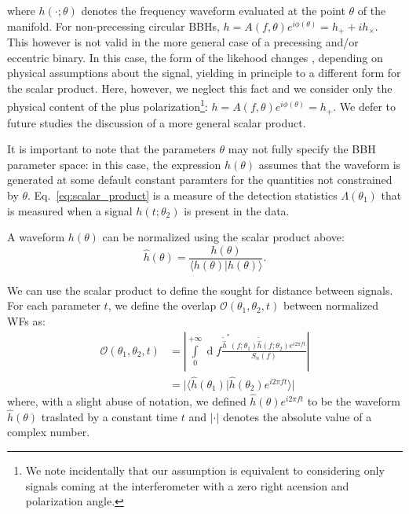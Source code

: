 \documentclass[twocolumn,showpacs,preprintnumbers,nofootinbib,prd,
superscriptaddress,10pt]{revtex4-2}
\renewcommand{\d}[1]{\ensuremath{\operatorname{d}\!{#1}}}
\newcommand{\scalar}[2]{\langle #1|#2 \rangle}
\begin{document}
where $h(\cdot; \theta)$ denotes the frequency waveform evaluated at the point $\theta$ of the manifold.
For non-precessing circular BBHs, $h = A(f,\theta) e^{i\phi(\theta)} = h_+ + i h_\times$. This however is not valid in the more general case of a precessing and/or eccentric binary. In this case, the form of the likehood changes \cite{Harry:2016ijz, PhysRevD.97.023004}, depending on physical assumptions about the signal, yielding in principle to a different form for the scalar product. Here, however, we neglect this fact and we consider only the physical content of the plus polarization\footnote{
We note incidentally that our assumption is equivalent to considering only signals coming at the interferometer with a zero right acension and polarization angle.}:
$h = A(f,\theta) e^{i\phi(\theta)} = h_+$. We defer to future studies the discussion of a more general scalar product.

It is important to note that the parameters $\theta$ may not fully specify the BBH parameter space: in this case, the expression $h(\theta)$ assumes that the waveform is generated at some default constant paramters for the quantities not constrained by $\theta$.
Eq.~\eqref{eq:scalar_product} is a measure of the detection statistics $\Lambda(\theta_1)$ that is measured when a signal $h(t; \theta_2)$ is present in the data.

A waveform $h(\theta)$ can be normalized using the scalar product above:
\begin{equation} \label{eq:normalization}
	\hat{h}(\theta) = \frac{h(\theta)}{\scalar{h(\theta)}{h(\theta)}}.
\end{equation}

We can use the scalar product to define the sought for distance between signals.
For each parameter $t$, we define the overlap $\mathcal{O}(\theta_1,\theta_2, t)$ between normalized WFs as:
\begin{align}\label{eq:overlap}
	\mathcal{O}(\theta_1,\theta_2, t) &= \left\lvert \int\limits_{0}^{+\infty} \d{f} \frac{\tilde{\hat{h}}^*(f;\theta_1)\tilde{\hat{h}}(f;\theta_2) e^{i2\pi ft}}{S_n(f)} \right\rvert \nonumber\\
	&= \lvert \scalar{\hat{h}(\theta_1)}{\hat{h}(\theta_2)e^{i 2\pi ft}} \rvert
\end{align}
where, with a slight abuse of notation, we defined $\hat{h}(\theta)e^{i 2\pi ft}$ to be the waveform $\hat{h}(\theta)$ traslated by a constant time $t$ and $\lvert \cdot \rvert$ denotes the absolute value of a complex number.
\end{document}
